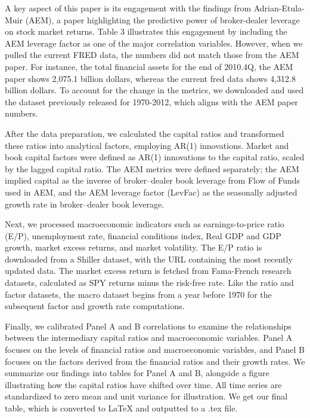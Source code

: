\documentclass{article}
\begin{document}
A key aspect of this paper is its engagement with the findings from Adrian-Etula-Muir (AEM), a paper highlighting the predictive power of broker-dealer leverage on stock market returns. Table 3 illustrates this engagement by including the AEM leverage factor as one of the major correlation variables. However, when we pulled the current FRED data, the numbers did not match those from the AEM paper. For instance, the total financial assets for the end of 2010.4Q, the AEM paper shows 2,075.1 billion dollars, whereas the current fred data shows 4,312.8 billion dollars. To account for the change in the metrics, we downloaded and used the dataset previously released for 1970-2012, which aligns with the AEM paper numbers.

After the data preparation, we calculated the capital ratios and transformed these ratios into analytical factors, employing AR(1) innovations. Market and book capital factors were defined as AR(1) innovations to the capital ratio, scaled by the lagged capital ratio. The AEM metrics were defined separately; the AEM implied capital as the inverse of broker–dealer book leverage from Flow of Funds used in AEM, and the AEM leverage factor (LevFac) as the seasonally adjusted growth rate in broker–dealer book leverage. 

Next, we processed macroeconomic indicators such as earnings-to-price ratio (E/P), unemployment rate, financial conditions index, Real GDP and GDP growth, market excess returns, and market volatility. The E/P ratio is downloaded from a Shiller dataset, with the URL containing the most recently updated data. The market excess return is fetched from Fama-French research datasets, calculated as SPY returns minus the risk-free rate. Like the ratio and factor datasets, the macro dataset begins from a year before 1970 for the subsequent factor and growth rate computations. 

Finally, we calibrated Panel A and B correlations to examine the relationships between the intermediary capital ratios and macroeconomic variables. Panel A focuses on the levels of financial ratios and macroeconomic variables, and Panel B focuses on the factors derived from the financial ratios and their growth rates. We summarize our findings into tables for Panel A and B, alongside a figure illustrating how the capital ratios have shifted over time. All time series are standardized to zero mean and unit variance for illustration. We get our final table, which is converted to LaTeX and outputted to a .tex file.
\end{document}
